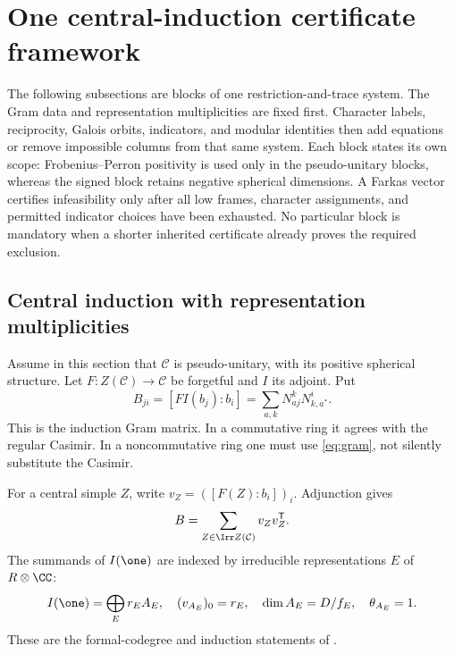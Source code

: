 \section{One central-induction certificate framework}\label{sec:unified-induction}
The following subsections are blocks of one restriction-and-trace system.
The Gram data and representation multiplicities are fixed first. Character
labels, reciprocity, Galois orbits, indicators, and modular identities then
add equations or remove impossible columns from that same system.
Each block states its own scope: Frobenius--Perron positivity is used only
in the pseudo-unitary blocks, whereas the signed block retains negative
spherical dimensions. A Farkas vector certifies infeasibility only after
all low frames, character assignments, and permitted indicator choices
have been exhausted. No particular block is mandatory when a shorter
inherited certificate already proves the required exclusion.

\subsection{Central induction with representation multiplicities}\label{sec:weighted}
Assume in this section that $\mathcal C$ is pseudo-unitary, with its
positive spherical structure. Let $F:Z(\mathcal C)\to\mathcal C$ be
forgetful and $I$ its adjoint. Put
\begin{equation}\label{eq:gram}
 B_{ji}=[FI(b_j):b_i]
 =\sum_{a,k}N_{aj}^{k}N_{k,a^*}^{i}.
\end{equation}
This is the induction Gram matrix. In a commutative ring it agrees with
the regular Casimir. In a noncommutative ring one must use
\eqref{eq:gram}, not silently substitute the Casimir.

For a central simple $Z$, write $v_Z=([F(Z):b_i])_i$. Adjunction gives
\begin{equation}\label{eq:fullgram}
 B=\sum_{Z\in\Irr Z(\mathcal C)}v_Zv_Z^{\mathsf T}.
\end{equation}
The summands of $I(\one)$ are indexed by irreducible representations
$E$ of $R\otimes\CC$:
\begin{equation}\label{eq:weightedlow}
 I(\one)=\bigoplus_E r_E A_E,
 \quad (v_{A_E})_0=r_E,
 \quad \dim A_E=D/f_E,
 \quad \theta_{A_E}=1.
\end{equation}
These are the formal-codegree and induction statements of
\cite[Theorems~2.5,2.13]{Ostrik3}.

